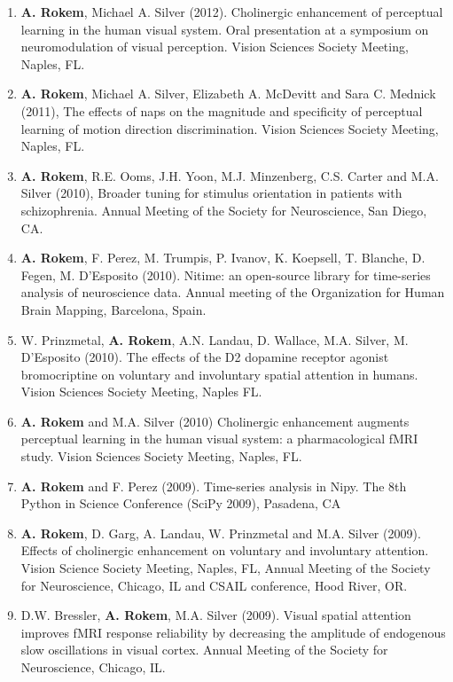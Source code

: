 \documentclass[11pt,fullpage]{article}
\begin{document}
\begin{enumerate}
\item {\bf A. Rokem}, Michael A. Silver (2012). Cholinergic enhancement of perceptual learning in the human visual system. Oral presentation at a symposium on neuromodulation of visual perception. Vision Sciences Society Meeting, Naples, FL.

\item {\bf A. Rokem}, Michael A. Silver, Elizabeth A. McDevitt and Sara C. Mednick (2011), The effects of naps on the magnitude and specificity of perceptual learning of motion direction discrimination. Vision Sciences Society Meeting, Naples, FL.

\item {\bf A. Rokem}, R.E. Ooms, J.H. Yoon, M.J. Minzenberg, C.S. Carter and M.A. Silver (2010), Broader tuning for stimulus orientation in patients with schizophrenia. Annual Meeting of the Society for Neuroscience, San Diego, CA.

\item {\bf A. Rokem}, F. Perez, M. Trumpis, P. Ivanov, K. Koepsell, T. Blanche, D. Fegen, M. D'Esposito (2010). Nitime: an open-source library for time-series analysis of neuroscience data. Annual meeting of the Organization for Human Brain Mapping, Barcelona, Spain.

\item W. Prinzmetal, {\bf A. Rokem}, A.N. Landau, D. Wallace, M.A. Silver, M. D’Esposito (2010). The effects of the D2 dopamine receptor agonist bromocriptine on voluntary and involuntary spatial attention in humans. Vision Sciences Society Meeting, Naples FL.

\item {\bf A. Rokem} and M.A. Silver (2010) Cholinergic enhancement augments perceptual learning in the human visual system: a pharmacological fMRI study. Vision Sciences Society Meeting, Naples, FL.

\item {\bf A. Rokem} and F. Perez (2009). Time-series analysis in Nipy. The 8th Python in Science Conference (SciPy 2009), Pasadena, CA

\item {\bf A. Rokem}, D. Garg, A. Landau, W. Prinzmetal and M.A. Silver (2009). Effects of cholinergic enhancement on voluntary and involuntary attention. Vision Science Society Meeting, Naples, FL, Annual Meeting of the Society for Neuroscience, Chicago, IL and CSAIL conference, Hood River, OR.

\item D.W. Bressler, {\bf A. Rokem}, M.A. Silver (2009). Visual spatial attention improves fMRI response reliability by decreasing the amplitude of endogenous slow oscillations in visual cortex. Annual Meeting of the Society for Neuroscience, Chicago, IL.


\end{enumerate}
\end{document}
